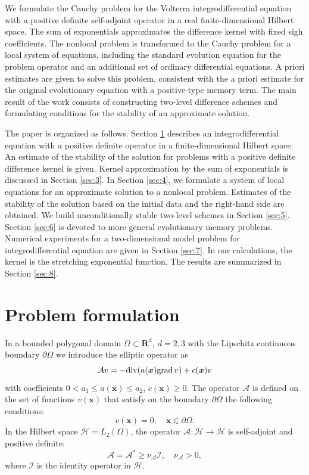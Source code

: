 \documentclass[3p]{elsarticle}
\numberwithin{equation}{section}
\begin{document}
We formulate the Cauchy problem for the Volterra integrodifferential equation with a positive definite self-adjoint operator in a real finite-dimensional Hilbert space.
The sum of exponentials approximates the difference kernel with fixed sigh coefficients.
The nonlocal problem is transformed to the Cauchy problem for a local system of equations, including the standard evolution equation for the problem operator and an additional set of ordinary differential equations.
A priori estimates are given to solve this problem, consistent with the a priori estimate for the original evolutionary equation with a positive-type memory term.
The main result of the work consists of constructing two-level difference schemes and formulating conditions for the stability of an approximate solution. 

The paper is organized as follows.
Section \ref{sec:2} describes an integrodifferential equation with a positive definite operator in a finite-dimensional Hilbert space.
An estimate of the stability of the solution for problems with a positive definite difference kernel is given.
Kernel approximation by the sum of exponentials is discussed in Section \ref{sec:3}.
In Section \ref{sec:4}, we formulate a system of local equations for an approximate solution to a nonlocal problem.
Estimates of the stability of the solution based on the initial data and the right-hand side are obtained.
We build unconditionally stable two-level schemes in Section \ref{sec:5}.
Section \ref{sec:6} is devoted to more general evolutionary memory problems.
Numerical experiments for a two-dimensional model problem for integrodifferential equation are given in Section \ref{sec:7}.
In our calculations, the kernel is the stretching exponential function.
The results are summarized in Section \ref{sec:8}.

\section{Problem formulation}\label{sec:2}

In a bounded polygonal domain $\Omega \subset \mathbf{R}^d, \ d = 2,3$ with the Lipschitz continuous boundary $\partial\Omega$
we introduce the elliptic operator as
\begin{equation}\label{2.1}
  \mathcal{A}  v = - {\rm div}  ( a({\bm x}) {\rm grad} \, v) + c({\bm x}) v
\end{equation} 
with coefficients $0 < a_1 \leq a({\bm x}) \leq a_2$, $c({\bm x}) \geq 0$.
The operator $\mathcal{A}$ is defined on the set of functions $v({\bm x})$ that satisfy
on the boundary $\partial\Omega$ the following conditions:
\begin{equation}\label{2.2}
  v ({\bm x}) = 0,
  \quad {\bm x} \in \partial \Omega .
\end{equation} 
In the Hilbert space $\mathcal{H} = L_2(\Omega)$, the operator $\mathcal{A}: \mathcal{H} \rightarrow \mathcal{H}$ is self-adjoint and positive definite:
\begin{equation}\label{2.3}
  \mathcal{A}  = \mathcal{A}^* \geq \nu_{\mathcal{A}}   \mathcal{I} ,
  \quad \nu_{\mathcal{A}}  > 0 ,    
\end{equation} 
where $\mathcal{I}$ is the identity operator in $\mathcal{H}$.
\end{document}
